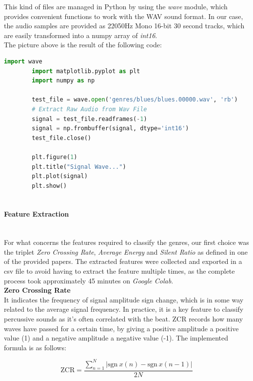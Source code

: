 \documentclass[12pt]{article}
\begin{document}
	
	This kind of files are managed in Python by using the \textit{wave} module, which provides convenient functions to work with the WAV sound format. In our case, the audio samples are provided as 22050Hz Mono 16-bit 30 second tracks\cite{marsyas}, which are easily transformed into a numpy array of \textit{int16}.\\
	The picture above is the result of the following code:
	\begin{lstlisting}[language=Python]
		import wave
		import matplotlib.pyplot as plt
		import numpy as np
		
		test_file = wave.open('genres/blues/blues.00000.wav', 'rb')
		# Extract Raw Audio from Wav File
		signal = test_file.readframes(-1)
		signal = np.frombuffer(signal, dtype='int16')
		test_file.close()
		
		plt.figure(1)
		plt.title("Signal Wave...")
		plt.plot(signal)
		plt.show()
		
	\end{lstlisting}
	\newpage
	
	\paragraph{Feature Extraction}\mbox{}\\\newline
	For what concerns the features required to classify the genres, our first choice was the triplet \textit{Zero Crossing Rate}, \textit{Average Energy} and \textit{Silent Ratio} as defined in one of the provided papers\cite{comparison}. The extracted features were collected and exported in a csv file to avoid having to extract the feature multiple times, as the complete process took approximately 45 minutes on \textit{Google Colab}.\\
	
	\textbf{Zero Crossing Rate}\\
	It indicates the frequency of signal amplitude sign change, which is in some way related to the average signal frequency. In practice, it is a key feature to classify percussive sounds as it's often correlated with the beat. ZCR records how many waves have passed for a certain time, by giving a positive amplitude a positive value (1) and a negative amplitude a negative value (-1). The implemented formula is as follows:
	
	\begin{equation}
		\text{ZCR}=\dfrac{\sum_{n=1}^N{\bigg|\text{sgn}\ x(n)-\text{sgn}\ x(n-1)\bigg|}}{2N}
	\end{equation}
	
\end{document}
